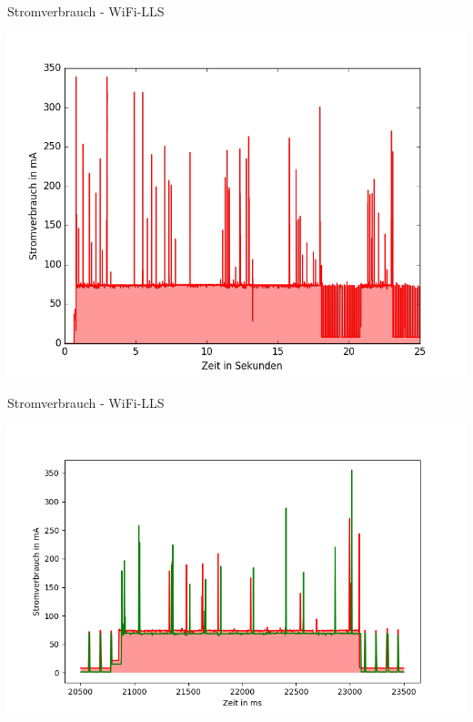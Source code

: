 \documentclass[18pt]{beamer}
\begin{document}
\begin{frame}{Stromverbrauch - WiFi-LLS}
	\begin{minipage}[c][\textheight][t]{\textwidth}
		\centering
		\includegraphics[height=0.85\textheight]{plots/wifills.png}
	\end{minipage}
\end{frame}

\begin{frame}{Stromverbrauch - WiFi-LLS}
	\begin{minipage}[c][\textheight][t]{\textwidth}
		\centering
		\includegraphics[height=0.85\textheight]{plots/wifillssendv.png}
	\end{minipage}
\end{frame}
\end{document}
